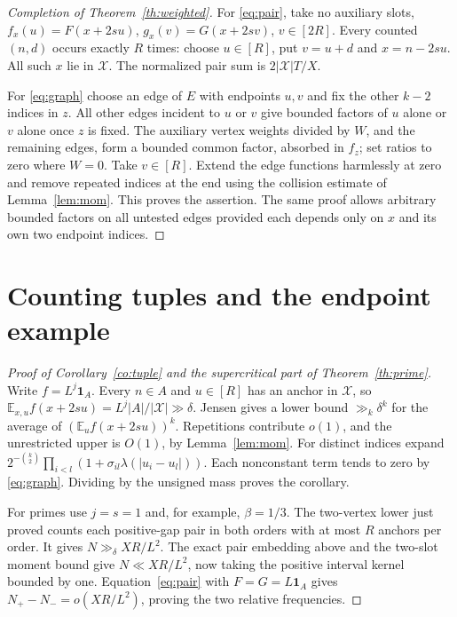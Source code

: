 \documentclass[11pt]{article}
\newcommand{\E}{\mathbb E}
\newcommand{\one}{\mathbf 1}
\begin{document}
\begin{proof}[Completion of Theorem~\ref{th:weighted}]
For \eqref{eq:pair}, take no auxiliary slots,
\(f_x(u)=F(x+2su)\), \(g_x(v)=G(x+2sv)\), \(v\in[2R]\).
Every counted \((n,d)\) occurs exactly \(R\) times: choose \(u\in[R]\),
put \(v=u+d\) and \(x=n-2su\). All such \(x\) lie in \(\mathcal X\).
The normalized pair sum is \(2|\mathcal X|T/X\).

For \eqref{eq:graph} choose an edge of \(E\) with endpoints \(u,v\)
and fix the other \(k-2\) indices in \(z\).
All other edges incident to \(u\) or \(v\) give bounded factors of
\(u\) alone or \(v\) alone once \(z\) is fixed. The auxiliary vertex
weights divided by \(W\), and the remaining edges, form a bounded
common factor, absorbed in \(f_z\); set ratios to zero where \(W=0\).
Take \(v\in[R]\). Extend the edge functions harmlessly at zero and
remove repeated indices at the end using the collision estimate of
Lemma~\ref{lem:mom}. This proves the assertion. The same proof allows
arbitrary bounded factors on all untested edges provided each depends
only on \(x\) and its own two endpoint indices.
\end{proof}

\section{Counting tuples and the endpoint example}
\begin{proof}[Proof of Corollary~\ref{co:tuple} and the supercritical part of
Theorem~\ref{th:prime}]
Write \(f=L^j\one_A\). Every \(n\in A\) and \(u\in[R]\) has an anchor in
\(\mathcal X\), so \(\E_{x,u} f(x+2su)=L^j|A|/|\mathcal X|\gg\delta\).
Jensen gives a lower bound \(\gg_k\delta^k\) for the average of
\((\E_u f(x+2su))^k\). Repetitions contribute \(o(1)\), and the unrestricted
upper is \(O(1)\), by Lemma~\ref{lem:mom}. For distinct indices expand
\(2^{-\binom k2}\prod_{i<l}(1+\sigma_{il}\lambda(|u_i-u_l|))\).
Each nonconstant term tends to zero by \eqref{eq:graph}. Dividing by the
unsigned mass proves the corollary.

For primes use \(j=s=1\) and, for example, \(\beta=1/3\).
The two-vertex lower just proved counts each positive-gap pair in both
orders with at most \(R\) anchors per order. It gives
\(N\gg_\delta XR/L^2\).
The exact pair embedding above and the two-slot moment bound give
\(N\ll XR/L^2\), now taking the positive interval kernel bounded by one.
Equation~\eqref{eq:pair} with \(F=G=L\one_A\) gives
\(N_+-N_-=o(XR/L^2)\), proving the two relative frequencies.
\end{proof}
\end{document}
